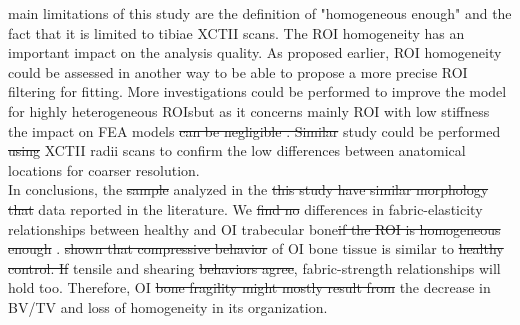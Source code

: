 \documentclass[a4paper,fleqn]{DC_ArtStyle}
\providecommand{\DIFadd}[1]{{\protect\color{blue}{#1}}} %
\providecommand{\DIFdel}[1]{{\protect\color{red}\sout{#1}}}                      %
\providecommand{\DIFaddbegin}{} %
\providecommand{\DIFaddend}{} %
\providecommand{\DIFdelbegin}{} %
\providecommand{\DIFdelend}{} %
\begin{document}
\DIFadd{The }\DIFaddend main limitations of this study are the definition of "homogeneous enough" and the fact that it is limited to tibiae XCTII scans. \DIFaddbegin \DIFadd{Moreover, having only one patient with OI type III where we could extract ROIs does not allows to do statistics. Effectively as those patients are in wheelchair, it could be interesting to analyze the impact of this condition on the weight bearing tibia. }\DIFaddend The ROI homogeneity has an important impact on the analysis quality. As proposed earlier, ROI homogeneity could be assessed in another way to be able to propose a more precise ROI filtering for fitting. More investigations could be performed to improve the model for highly heterogeneous ROIs\DIFaddbegin \DIFadd{, }\DIFaddend but as it concerns mainly ROI with low stiffness the impact on FEA models \DIFdelbegin \DIFdel{can be negligible . Similar }\DIFdelend \DIFaddbegin \DIFadd{could be negligible if the proportion of such low stiffness ROIs stays low. A similar }\DIFaddend study could be performed \DIFdelbegin \DIFdel{using }\DIFdelend \DIFaddbegin \DIFadd{on }\DIFaddend XCTII radii scans to confirm the low differences between anatomical locations for coarser resolution. \DIFaddbegin \DIFadd{Another limitation is that the scans were performed on different devices which were not cross-calibrated. However, as they are the same model, it is expected to have a minor impact.}\DIFaddend \\

In conclusions, the \DIFdelbegin \DIFdel{sample }\DIFdelend \DIFaddbegin \DIFadd{samples }\DIFaddend analyzed in the \DIFdelbegin \DIFdel{this study have similar morphology that }\DIFdelend \DIFaddbegin \DIFadd{present study had similar morphology compared to }\DIFaddend data reported in the literature. We \DIFdelbegin \DIFdel{find no }\DIFdelend \DIFaddbegin \DIFadd{couldn't find }\DIFaddend differences in fabric-elasticity relationships between healthy and OI trabecular bone\DIFdelbegin \DIFdel{if the ROI is homogeneous enough }\DIFdelend \DIFaddbegin \DIFadd{, when the ROIs were homogeneous enough i.e. with a CV lower than 0.263}\DIFaddend . \citeauthor{Indermaur2021}\cite{Indermaur2021} \DIFdelbegin \DIFdel{shown that compressive behavior }\DIFdelend \DIFaddbegin \DIFadd{could show that the compressive behaviour }\DIFaddend of OI bone tissue is similar to \DIFdelbegin \DIFdel{healthy control. If }\DIFdelend \DIFaddbegin \DIFadd{the one of healthy control at the ECM level. If the }\DIFaddend tensile and shearing \DIFdelbegin \DIFdel{behaviors agree}\DIFdelend \DIFaddbegin \DIFadd{behaviour is similar as well}\DIFaddend , fabric-strength relationships will hold too. Therefore, OI \DIFdelbegin \DIFdel{bone fragility might mostly result from }\DIFdelend \DIFaddbegin \DIFadd{trabecular bone can explain part of the bone fragility by }\DIFaddend the decrease in BV/TV and \DIFaddbegin \DIFadd{the }\DIFaddend loss of homogeneity in its \DIFaddbegin \DIFadd{trabecular }\DIFaddend organization.
\end{document}
